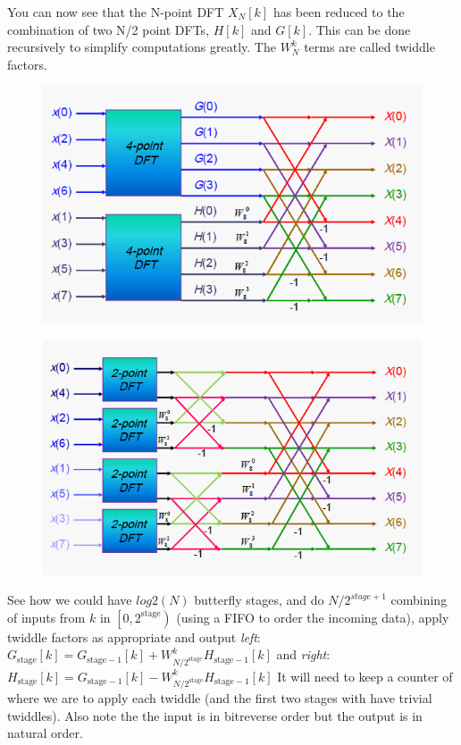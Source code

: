 \documentclass{article}
\begin{document}
You can now see that the N-point DFT $X_{N}[k]$ has been reduced to the combination of two N/2 point DFTs, $H[k]$ and $G[k]$.
This can be done recursively to simplify computations greatly. The $W_{N}^{k}$ terms are called twiddle factors.

\begin{figure}[h!]
  \begin{minipage}{0.5\textwidth}
    \centering
    \includegraphics[width=\linewidth]{dit_1.png}
      \label{fig:dit1}
  \end{minipage}
  \begin{minipage}{0.5\textwidth}
    \centering
    \includegraphics[width=\linewidth]{dit_2.png}
      \label{fig:dit2}
 \end{minipage}
\end {figure}

See how we could have $log2\left(N\right)$ butterfly stages, and do $N/2^{stage+1}$ combining of inputs from $k$ in $\left[0, 2^{\text{stage}}\right)$
(using a FIFO to order the incoming data), apply twiddle factors as appropriate and output
\emph{left}: $G_{\text{stage}}[k]=G_{\text{stage}-1}[k]+W_{N/2^{\text{stage}}}^{k} H_{\text{stage}-1}[k]$
and \emph{right}: $H_{\text{stage}}[k]=G_{\text{stage}-1}[k]-W_{N/2^{\text{stage}}}^{k} H_{\text{stage}-1}[k]$
It will need to keep a counter of where we are to apply each twiddle (and the first two stages with have trivial twiddles).
Also note the the input is in bitreverse order but the output is in natural order.
\end{document}
